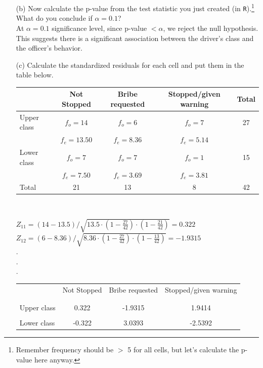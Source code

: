 \documentclass[12pt,letterpaper]{article}
\begin{document}
\begin{enumerate}
	\newpage
	\item [(b)]
	Now calculate the p-value from the test statistic you just created (in \texttt{R}).\footnote{Remember frequency should be $>$ 5 for all cells, but let's calculate the p-value here anyway.}  What do you conclude if $\alpha = 0.1$?\\
	
	 
	At $\alpha = 0.1$ significance level, since p-value $< \alpha$, we reject the null hypothesis. This suggests there is a significant association between the driver's class and the officer's behavior.\\
	
	\item [(c)] Calculate the standardized residuals for each cell and put them in the table below.
	\vspace{1cm}
	
		\begin{tabular}{|l|c|c|c|c|}
		\hline
		& Not Stopped & Bribe requested & Stopped/given warning & Total \\
		\hline
		Upper class & $f_o=14$ & $f_o=6$ & $f_o=7$ & 27 \\
		& $f_e = 13.50$ & $f_e = 8.36$ & $f_e = 5.14$ & \\
		\hline
		Lower class & $f_o=7$ & $f_o=7$ & $f_o=1$ & 15 \\
		& $f_e = 7.50$ & $f_e = 3.69$ & $f_e = 3.81$ & \\
		\hline
		Total & 21 & 13 & 8 & 42 \\
		\hline
	\end{tabular}\\
	\vspace{1cm}
	
	 $Z_{11} = (14 - 13.5) / \sqrt{13.5 \cdot \left( 1 - \frac{27}{42} \right) \cdot \left( 1 - \frac{21}{42} \right)} = 0.322$\\
	 $Z_{12} = (6 - 8.36) / \sqrt{8.36 \cdot \left( 1 - \frac{27}{42} \right) \cdot \left( 1 - \frac{13}{42} \right)} = -1.9315$\\
	 .\\
	 .\\
	 .\\
	
	\begin{table}[h]
		\centering
		\begin{tabular}{l | c c c }
			& Not Stopped & Bribe requested & Stopped/given warning \\
			\\[-1.8ex] 
			\hline \\[-1.8ex]
			Upper class & 0.322 & -1.9315 & 1.9414 \\
			\\
			Lower class & -0.322 & 3.0393 & -2.5392  \\
			

\end{tabular}
\end{table}
\end{enumerate}
\end{document}
